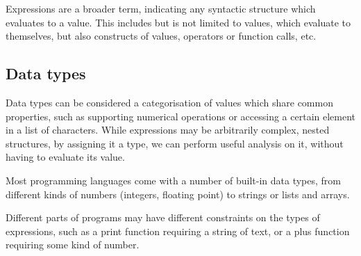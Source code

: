\documentclass[nofilelist]{cslthse-msc}
\newcommand{\CR}[1]{\textcolor{green!60!black}{[\textbf{CR}:#1]}}
\begin{document}
Expressions are a broader term, indicating any syntactic structure which evaluates to a value.
This includes but is not limited to values, which evaluate to themselves, but also constructs of values, operators or function calls, etc.

\subsection{Data types}
Data types can be considered a categorisation of values which share common properties, such as supporting numerical operations or accessing a certain element in a list of characters.
While expressions may be arbitrarily complex, nested structures, by assigning it a type, we can perform useful analysis on it, without having to evaluate its value.

Most programming languages come with a number of built-in data types, from different kinds of numbers (integers, floating point) to strings or lists and arrays.

Different parts of programs may have different constraints on the types of expressions, such as a print function requiring a string of text, or a plus function requiring some kind of number.
\end{document}
